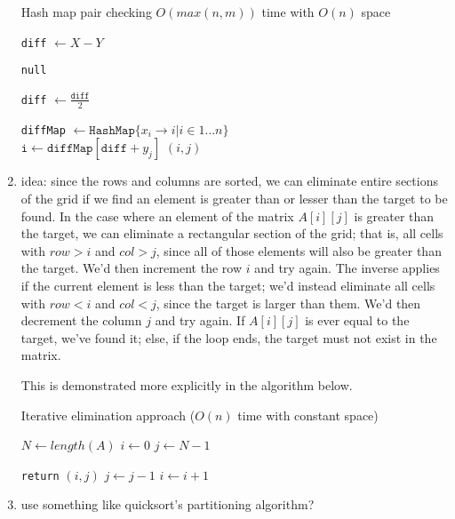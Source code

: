 \documentclass[12pt]{article}
\begin{document}
\begin{enumerate}
    \begin{algorithm}
        \caption{Hash map pair checking $O(max(n, m))$ time with $O(n)$ space}
        \begin{algorithmic}
            \State \texttt{diff} $\gets X - Y$

                \State \Return \texttt{null}
            \EndIf

            \State \texttt{diff} $\gets \frac{\texttt{diff}}{2}$

            \State \texttt{diffMap} $ \gets \texttt{HashMap}\{x_i \rightarrow i | i \in 1 \dots n\}$\\

                    \State $\texttt{i} \gets \texttt{diffMap}[\texttt{diff} + y_j]$
                    \State \Return $(i, j)$
                \EndIf
            \EndFor
        \end{algorithmic}
    \end{algorithm}

    \item idea: since the rows and columns are sorted, we can eliminate entire sections of the grid if we find an element 
    is greater than or lesser than the target to be found. In the case where an element of the matrix $A[i][j]$ is greater 
    than the target, we can eliminate a rectangular section of the grid; that is, all cells with $row > i$ and $col > j$, since 
    all of those elements will also be greater than the target. We'd then increment the row $i$ and try again. The inverse 
    applies if the current element is less than the target; we'd instead eliminate all cells with $row < i$ and $col < j$, 
    since the target is larger than them. We'd then decrement the column $j$ and try again. If $A[i][j]$ is ever equal to 
    the target, we've found it; else, if the loop ends, the target must not exist in the matrix.
    
    This is demonstrated more explicitly in the algorithm below.
    
    \begin{algorithm}
        \caption{Iterative elimination approach ($O(n)$ time with constant space)}\label{alg:gridsearch}
        \begin{algorithmic}
            \State $N \gets length(A)$
            \State $i \gets 0$
            \State $j \gets N - 1$
            
                    \State \texttt{return} $(i, j)$
                \Else
                        \State $j \gets j - 1$
                    \Else
                        \State $i \gets i + 1$
                    \EndIf
                \EndIf
            \EndWhile
        \end{algorithmic}
    \end{algorithm}
    
    \item use something like quicksort's partitioning algorithm?
\end{enumerate}
\end{document}
